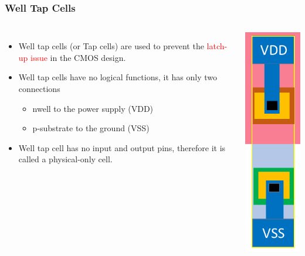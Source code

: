 \documentclass{beamer}
\begin{document}
	\begin{frame}
	\frametitle{Well Tap Cells}
		\begin{columns}
	
	\begin{itemize}
		\item Well tap cells (or Tap cells) are used to prevent the \textcolor{red} { latch-up issue} in the CMOS design.
		\item Well tap cells have no logical functions, it has only two connections
		\begin{itemize}
			\item nwell to the power supply (VDD)
			\item p-substrate to the ground (VSS)
		\end{itemize}
		\item Well tap cell has no input and output pins, therefore it is called a physical-only cell.
	\end{itemize}
	
	\begin{center}
		\includegraphics[width=0.3 \textwidth]{wellTapCell}
	\end{center}
\end{columns}
\end{frame}	
\end{document}
